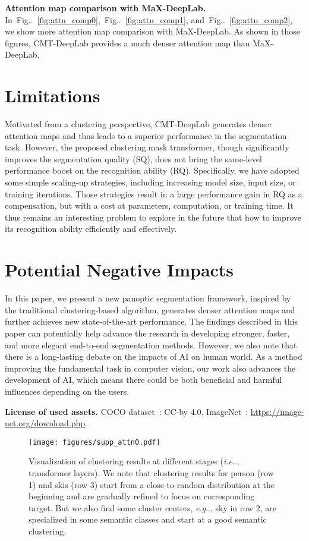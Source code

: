 \documentclass[10pt,twocolumn,letterpaper]{article}
\makeatletter
\DeclareRobustCommand\onedot{\futurelet\@let@token\@onedot}
\def\@onedot{\ifx\@let@token.\else.\null\fi\xspace}
\def\eg{\emph{e.g}\onedot} \def\Eg{\emph{E.g}\onedot}
\def\ie{\emph{i.e}\onedot} \def\Ie{\emph{I.e}\onedot}
\newcommand{\figref}[1]{Fig\onedot~\ref{#1}}
\makeatother
\begin{document}
\noindent\textbf{Attention map comparison with MaX-DeepLab.}
In~\figref{fig:attn_comp0},~\figref{fig:attn_comp1}, and~\figref{fig:attn_comp2}, we show more attention map comparison with MaX-DeepLab. As shown in those figures, CMT-DeepLab provides a much denser attention map than MaX-DeepLab.

\section{Limitations}
Motivated from a clustering perspective, CMT-DeepLab generates denser attention maps and thus leads to a superior performance in the segmentation task.
However, the proposed clustering mask transformer, though significantly improves the segmentation quality (SQ), does not bring the same-level performance boost on the recognition ability (RQ).
Specifically, we have adopted some simple scaling-up strategies, including increasing model size, input size, or training iterations. Those strategies result in a large performance gain in RQ as a compensation, but with a cost at parameters, computation, or training time. It thus remains an interesting problem to explore in the future that how to improve its recognition ability efficiently and effectively.

\section{Potential Negative Impacts}
In this paper, we present a new panoptic segmentation framework, inspired by the traditional clustering-based algorithm, generates denser attention maps and further achieves new state-of-the-art performance. The findings described in this paper can potentially help advance the research in developing stronger, faster, and more elegant end-to-end segmentation methods. However, we also note that there is a long-lasting debate on the impacts of AI on human world. As a method improving the fundamental task in computer vision, our work also advances the development of AI, which means there could be both beneficial and harmful influences depending on the users.

\vspace{0.5ex}
\noindent\textbf{License of used assets.} COCO dataset~\cite{lin2014microsoft}: CC-by 4.0. ImageNet~\cite{russakovsky2015imagenet}: \url{https://image-net.org/download.php}.

\begin{figure*}[thb]
    \centering
    \texttt{[image: figures/supp\_attn0.pdf]}
    \caption{Visualization of clustering results at different stages (\ie, transformer layers). We note that clustering results for person (row 1) and skis (row 3) start from a close-to-random distribution at the beginning and are gradually refined to focus on corresponding target. But we also find some cluster centers, \eg, sky in row 2, are specialized in some semantic classes and start at a good semantic clustering.}
    \label{fig:supp_attn0}
\end{figure*}
\end{document}
